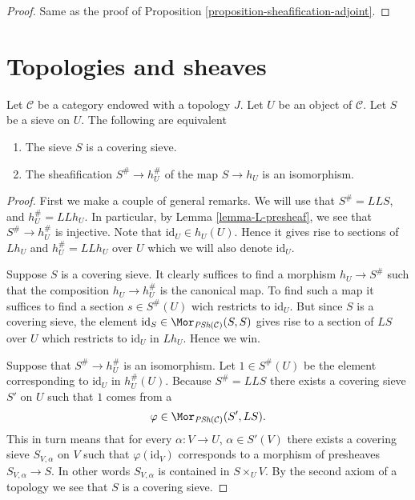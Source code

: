 \begin{proof}
Same as the proof of Proposition \ref{proposition-sheafification-adjoint}.
\end{proof}














\section{Topologies and sheaves}
\label{section-topology-and-sheaves}

\begin{lemma}
\label{lemma-sieve-sheafification}
Let $\mathcal{C}$ be a category endowed with a topology $J$.
Let $U$ be an object of $\mathcal{C}$.
Let $S$ be a sieve on $U$. The following are equivalent
\begin{enumerate}
\item The sieve $S$ is a covering sieve.
\item The sheafification $S^\# \to h_U^\#$
of the map $S \to h_U$ is an isomorphism.
\end{enumerate}
\end{lemma}

\begin{proof}
First we make a couple of general remarks.
We will use that $S^\# = LLS$, and $h_U^\# = LLh_U$.
In particular, by Lemma \ref{lemma-L-presheaf}, we see that
$S^\# \to h_U^\#$ is injective. Note that
$\text{id}_U \in h_U(U)$. Hence it gives rise to
sections of $Lh_U$ and $h_U^\# = LLh_U$ over $U$ which
we will also denote $\text{id}_U$.

\medskip\noindent
Suppose $S$ is a covering sieve. It clearly suffices to
find a morphism $h_U \to S^\#$ such that the composition
$h_U \to h_U^\#$ is the canonical map. To find such a map
it suffices to find a section $s \in S^\#(U)$ wich restricts
to $\text{id}_U$. But since $S$ is a
covering sieve, the element
$\text{id}_S \in \Mor_{\textit{PSh}(\mathcal{C})}(S, S)$
gives rise to a section of $LS$ over $U$ which restricts to
$\text{id}_U$ in $Lh_U$. Hence we win.

\medskip\noindent
Suppose that $S^\# \to h_U^\#$ is an isomorphism.
Let $1 \in S^\#(U)$ be the element corresponding to
$\text{id}_U$ in $h_U^\#(U)$. Because $S^\# = LLS$
there exists a covering sieve $S'$ on $U$ such that
$1$ comes from a
$$
\varphi \in \Mor_{\textit{PSh}(\mathcal{C})}(S', LS).
$$
This in turn means that for every $\alpha : V \to U$,
$\alpha\in S'(V)$ there exists a covering sieve $S_{V, \alpha}$
on $V$ such that $\varphi(\text{id}_V)$ corresponds to
a morphism of presheaves $S_{V, \alpha} \to S$. In other words
$S_{V, \alpha}$ is contained in $S \times_U V$. By the second
axiom of a topology we see that $S$ is a covering sieve.
\end{proof}

